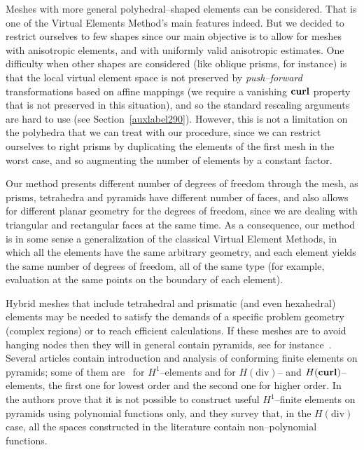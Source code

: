 Meshes with more general polyhedral--shaped elements can be considered. 
That is one of the Virtual Elements Method's main features indeed. 
But we decided to restrict
ourselves to few 
shapes since our main objective is to allow for meshes with anisotropic elements, 
and with uniformly valid anisotropic 
estimates. 
One 
difficulty when other shapes are considered (like
oblique prisms, for instance) is that the local virtual element space is not 
preserved by 
\emph{push--forward} transformations based on affine mappings
(we require a vanishing ${\bf curl}$ property that is not preserved in this 
situation), and so the standard rescaling arguments are hard to use 
(see Section~\ref{auxlabel290}). However, this is not a limitation on the polyhedra
that we can treat with our procedure, since we can restrict ourselves
to right prisms by duplicating the elements of the first mesh in the worst case,
and so augmenting the number of elements by a constant factor.

Our method presents different number of degrees of freedom through the 
mesh, as prisms, tetrahedra and pyramids have different number of faces, and also 
allows for different planar geometry for the degrees of freedom, since we are 
dealing
with triangular and rectangular faces at the same time. As a consequence, our 
method is in some sense a generalization of the classical Virtual Element Methods,
in which all the elements have the same arbitrary geometry, and each element yields
the same number of degrees of freedom, all of the same type (for example, 
evaluation at the same points on the boundary of each element).

Hybrid meshes that include tetrahedral and prismatic (and even hexahedral) 
elements may be needed to satisfy the demands of a specific problem geometry 
(complex regions) or to reach efficient calculations. If these meshes are 
to avoid hanging nodes then they will in general contain pyramids, see 
for instance~\cite{owenSaigal}. Several articles contain introduction and analysis
of conforming finite elements on pyramids; some of them are~\cite{bergot} 
for $H^1$--elements and 
\cite{gh99, Nigam-2012} for $H(\mbox{div})$-- and $H({\bf curl})$--elements, 
the first one for 
lowest order and the second one for higher order. 
In~\cite{Nigam-2012} the authors prove that it is not possible to construct 
useful $H^1$--finite 
elements on pyramids using  polynomial functions only, and they
survey that, in the $H(\mbox{div})$ 
case, all the spaces 
constructed in the literature contain non--polynomial functions.

